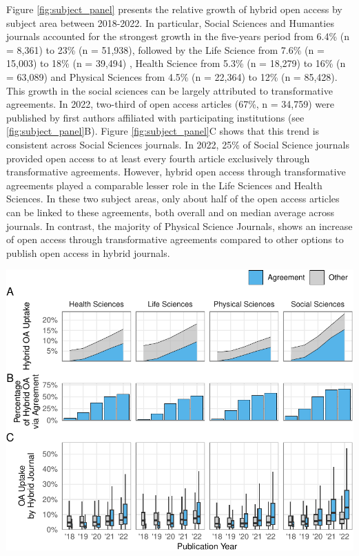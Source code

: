 \documentclass[a4paper,man,floatsintext,longtable,noextraspace,12pt]{apa6}
\begin{document}
Figure \ref{fig:subject_panel} presents the relative growth of hybrid
open access by subject area between 2018-2022. In particular, Social
Sciences and Humanties journals accounted for the strongest growth in
the five-years period from 6.4\% (n = 8,361) to 23\% (n = 51,938),
followed by the Life Science from 7.6\% (n = 15,003) to 18\% (n =
39,494) , Health Science from 5.3\% (n = 18,279) to 16\% (n = 63,089)
and Physical Sciences from 4.5\% (n = 22,364) to 12\% (n = 85,428). This
growth in the social sciences can be largely attributed to
transformative agreements. In 2022, two-third of open access articles
(67\%, n = 34,759) were published by first authors affiliated with
participating institutions (see \ref{fig:subject_panel}B). Figure
\ref{fig:subject_panel}C shows that this trend is consistent across
Social Sciences journals. In 2022, 25\% of Social Science journals
provided open access to at least every fourth article exclusively
through transformative agreements. However, hybrid open access through
transformative agreements played a comparable lesser role in the Life
Sciences and Health Sciences. In these two subject areas, only about
half of the open access articles can be linked to these agreements, both
overall and on median average across journals. In contrast, the majority
of Physical Science Journals, shows an increase of open access through
transformative agreements compared to other options to publish open
access in hybrid journals.

\begin{center}\includegraphics[width=0.99\linewidth,]{fig/subject_panel-1} \end{center}
\end{document}
